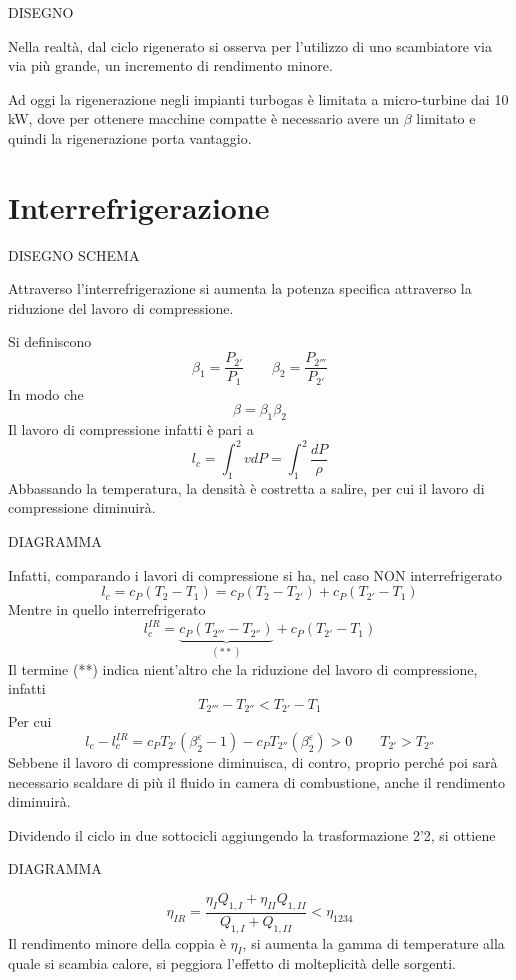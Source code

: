 \begin{adjustwidth}{2in}{}
	DISEGNO
	
	Nella realtà, dal ciclo rigenerato si osserva per l'utilizzo di uno scambiatore via via più grande, un incremento di rendimento minore. 
	
	Ad oggi la rigenerazione negli impianti turbogas è limitata a micro-turbine dai 10 kW, dove per ottenere macchine compatte è necessario avere un $\beta$ limitato e quindi la rigenerazione porta vantaggio. 
\end{adjustwidth}





\section{Interrefrigerazione}
\begin{adjustwidth}{2in}{}
	
	DISEGNO SCHEMA
	
	Attraverso l'interrefrigerazione si aumenta la potenza specifica attraverso la riduzione del lavoro di compressione. \newline 
	
	Si definiscono 
	\[\beta_1 = \dfrac{P_{2'}}{P_1}\qquad \beta_2 = \dfrac{P_{2'''}}{P_{2'}}\]
	In modo che 
	\[\beta = \beta_1\beta_2\]
	Il lavoro di compressione infatti è pari a
	\[l_c = \int_{1}^{2}vdP = \int_{1}^{2}\dfrac{dP}{\rho}\]
	Abbassando la temperatura, la densità è costretta a salire, per cui il lavoro di compressione diminuirà.
	
	DIAGRAMMA 
	
	
	Infatti, comparando i lavori di compressione si ha, nel caso NON interrefrigerato
	\[l_c = c_P(T_2-T_1) = c_P(T_2-T_{2'}) + c_P(T_{2'}-T_1)\]
	Mentre in quello interrefrigerato
	\[l_c^{IR} = \underbrace{c_P(T_{2'''}-T_{2''})}_{(**)} + c_P(T_{2'}-T_1)\]
	Il termine (**) indica nient'altro che la riduzione del lavoro di compressione, infatti
	\[T_{2'''}-T_{2''}<T_{2'}-T_1\]
	Per cui
	\[l_c - l_c^{IR} = c_PT_{2'}(\beta_2^\varepsilon-1) - c_PT_{2''}(\beta_2^\varepsilon)>0 \qquad T_{2'} > T_{2''}\]
	Sebbene il lavoro di compressione diminuisca, di contro, proprio perché poi sarà necessario scaldare di più il fluido in camera di combustione, anche il rendimento diminuirà. \newline 
	
	Dividendo il ciclo in due sottocicli aggiungendo la trasformazione 2'2, si ottiene 
	
	DIAGRAMMA 
	
	\[\eta_{IR} = \dfrac{\eta_IQ_{1,I} + \eta_{II}Q_{1,II}}{Q_{1,I} + Q_{1,II}}<\eta_{1234}\]
	Il rendimento minore della coppia è $\eta_{I}$, si aumenta la gamma di temperature alla quale si scambia calore, si peggiora l'effetto di molteplicità delle sorgenti. 
\end{adjustwidth}





